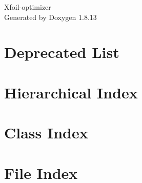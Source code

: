 \documentclass[twoside]{book}
\newcommand{\+}{\discretionary{\mbox{\scriptsize$\hookleftarrow$}}{}{}}
\newcommand{\clearemptydoublepage}{%
  \newpage{\pagestyle{empty}\cleardoublepage}%
}
\begin{document}
\hypersetup{pageanchor=false,
             bookmarksnumbered=true,
             pdfencoding=unicode
            }
\begin{titlepage}
\vspace*{7cm}
\begin{center}%
{\Large Xfoil-\/optimizer }\\
\vspace*{1cm}
{\large Generated by Doxygen 1.8.13}\\
\end{center}
\end{titlepage}
\clearemptydoublepage
{}
\tableofcontents
\clearemptydoublepage
{}
\hypersetup{pageanchor=true}

\chapter{Deprecated List}
\label{deprecated}

\chapter{Hierarchical Index}

\chapter{Class Index}

\chapter{File Index}

\end{document}

